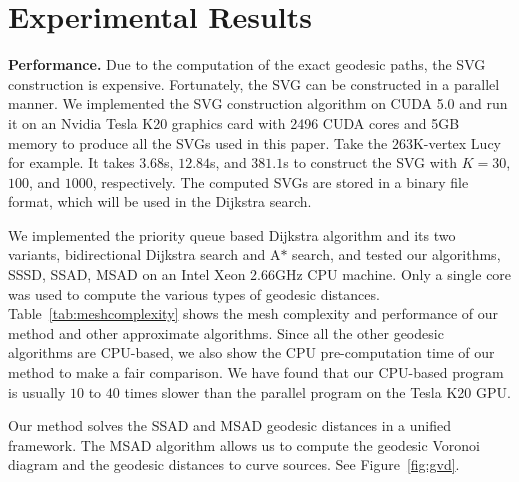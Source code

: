 \section{Experimental Results }
\label{sec:results}

\noindent\textbf{Performance.} Due to the computation of the exact
geodesic paths, the SVG construction is expensive. Fortunately, the
SVG can be constructed in a parallel manner. We implemented the SVG
construction algorithm on CUDA 5.0 and run it on an Nvidia Tesla K20
graphics card with 2496 CUDA cores and 5GB memory to produce all the
SVGs used in this paper. Take the $263$K-vertex Lucy for example. It
takes $3.68$s, $12.84$s, and $381.1$s to construct the SVG with
$K=30$, $100$, and $1000$, respectively. The computed SVGs are
stored in a binary file format, which will be used in the Dijkstra
search.

We implemented the priority queue based Dijkstra algorithm and its
two variants, bidirectional Dijkstra search and A$*$ search, and
tested our algorithms, SSSD, SSAD, MSAD on an Intel Xeon 2.66GHz CPU
machine. Only a single core was used to compute the various types of
geodesic distances. Table~\ref{tab:meshcomplexity} shows the mesh
complexity and performance of our method and other approximate
algorithms. Since all the other geodesic algorithms are CPU-based,
we also show the CPU pre-computation time of our method to make a
fair comparison. We have found that our CPU-based program is usually
$10$ to $40$ times slower than the parallel program on the Tesla K20
GPU.

Our method solves the SSAD and MSAD geodesic distances in a unified
framework. The MSAD algorithm allows us to compute the geodesic
Voronoi diagram and the geodesic distances to curve sources. See
Figure~\ref{fig:gvd}.

